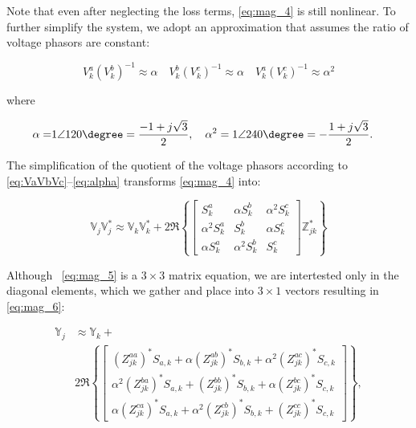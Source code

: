 \setlength{\abovedisplayskip}{-0pt}
\setlength{\belowdisplayskip}{-0pt}

Note that even after neglecting the loss terms, \eqref{eq:mag_4} is still nonlinear.  To further simplify the system, we adopt an approximation that assumes the ratio of voltage phasors are constant:

\begin{equation}
	V_{k}^{a} (V_{k}^{b})^{-1} \approx \alpha \quad V_{k}^{b} (V_{k}^{c})^{-1} \approx \alpha \quad V_{k}^{a} (V_{k}^{c})^{-1} \approx \alpha^{2}
    \label{eq:VaVbVc}
\end{equation}

\noindent where

\begin{align}
	\alpha = &1 \angle 120 \degree = \frac{-1 + j\sqrt{3}}{2}, \quad \alpha^{2} = 1 \angle 240 \degree = -\frac{1 + j\sqrt{3}}{2}.
    \label{eq:alpha}
\end{align}

The simplification of the quotient of the voltage phasors according to \eqref{eq:VaVbVc}--\eqref{eq:alpha} transforms \eqref{eq:mag_4} into:
	
\begin{equation}
	\mathbb{V}_{j} \mathbb{V}_{j}^{*} \approx \mathbb{V}_{k} \mathbb{V}_{k}^{*} + 2 \Re \left\{
    \begin{bmatrix}
    	S_{k}^{a} & \alpha S_{k}^{b} & \alpha^{2} S_{k}^{c} \\
    	\alpha^{2} S_{k}^{a} & S_{k}^{b} & \alpha S_{k}^{c} \\
    	\alpha S_{k}^{a} & \alpha^{2} S_{k}^{b} & S_{k}^{c}
    \end{bmatrix}
    \mathbb{Z}_{jk}^* \right\}
    \label{eq:mag_5}
\end{equation}

Although ~\eqref{eq:mag_5} is a $3\times 3$ matrix equation, we are intertested only in the diagonal elements, which we gather and place into $3 \times 1$ vectors resulting in \eqref{eq:mag_6}:

\begin{align}
	\mathbb{Y}_{j} &\approx \mathbb{Y}_{k} +\nonumber \\
    & 2 \Re \left\{
    \begin{bmatrix}
    	(Z_{jk}^{aa})^{*} S_{a,k}  + \alpha (Z_{jk}^{ab})^{*} S_{b,k}  + \alpha^{2} (Z_{jk}^{ac})^{*} S_{c,k} \\
    	\alpha^{2} (Z_{jk}^{ba})^{*} S_{a,k} + (Z_{jk}^{bb})^{*} S_{b,k} + \alpha (Z_{jk}^{bc})^{*} S_{c,k} \\
    	\alpha (Z_{jk}^{ca})^{*} S_{a,k} + \alpha^{2} (Z_{jk}^{cb})^{*} S_{b,k} + (Z_{jk}^{cc})^{*} S_{c,k}
    \end{bmatrix}
	\right\}
    \label{eq:mag_6},
\end{align}

